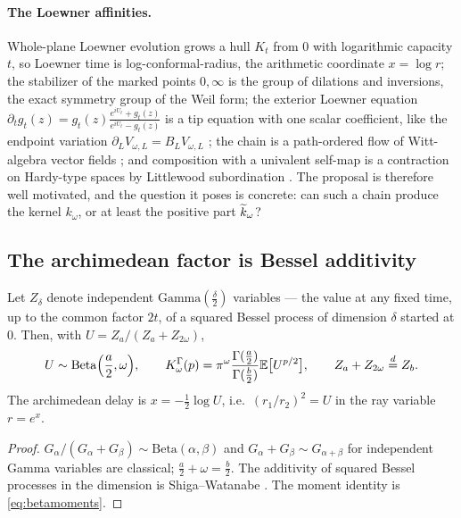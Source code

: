 \paragraph{The Loewner affinities.} Whole-plane Loewner evolution grows a hull
$K_t$ from $0$ with logarithmic capacity $t$, so Loewner time is
log-conformal-radius, the arithmetic coordinate $x=\log r$; the stabilizer of
the marked points $0,\infty$ is the group of dilations and inversions, the
exact symmetry group of the Weil form; the exterior Loewner equation
$\partial_tg_t(z)=g_t(z)\frac{e^{iU_t}+g_t(z)}{e^{iU_t}-g_t(z)}$ is a tip
equation with one scalar coefficient, like the endpoint variation
$\partial_LV_{\omega,L}=B_LV_{\omega,L}$ \cite[Proposition~9.1]{WilsonLines};
the chain is a path-ordered flow of Witt-algebra vector fields
\cite{BauerBernard,Lawler}; and composition with a univalent self-map is a contraction
on Hardy-type spaces by Littlewood subordination \cite{Shapiro}. The proposal
is therefore well motivated, and the question it poses is concrete: can such a
chain produce the kernel $k_\omega$, or at least the positive part $\widetilde k_\omega$?

\subsection{The archimedean factor is Bessel additivity}

\begin{proposition}\label{prop:bessel}
Let $Z_\delta$ denote independent $\mathrm{Gamma}(\frac\delta2)$ variables ---
the value at any fixed time, up to the common factor $2t$, of a squared Bessel
process of dimension $\delta$ started at $0$. Then, with $U=Z_a/(Z_a+Z_{2\omega})$,
\begin{equation}\label{eq:bessel}
 U\sim\mathrm{Beta}\Big(\frac a2,\omega\Big),\qquad
 K^\Gamma_\omega(p)=\pi^\omega\frac{\Gamma(\frac a2)}{\Gamma(\frac b2)}\mathbb E\big[U^{p/2}\big],
 \qquad Z_a+Z_{2\omega}\stackrel d=Z_b .
\end{equation}
The archimedean delay is $x=-\frac12\log U$, i.e.\ $(r_1/r_2)^2=U$ in the ray
variable $r=e^x$.
\end{proposition}
\begin{proof}
$G_\alpha/(G_\alpha+G_\beta)\sim\mathrm{Beta}(\alpha,\beta)$ and
$G_\alpha+G_\beta\sim G_{\alpha+\beta}$ for independent Gamma variables are
classical; $\frac a2+\omega=\frac b2$. The additivity of squared Bessel
processes in the dimension is Shiga--Watanabe \cite{ShigaWatanabe,RevuzYor}.
The moment identity is \eqref{eq:betamoments}.
\end{proof}

